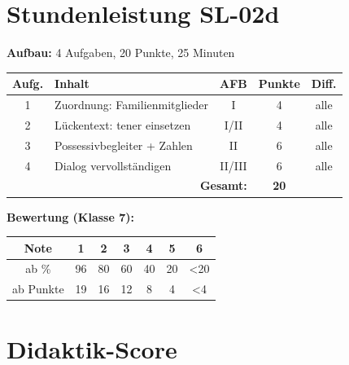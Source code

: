 \documentclass[11pt,a4paper]{article}
\begin{document}
\section{Stundenleistung SL-02d}

\textbf{Aufbau:} 4 Aufgaben, 20 Punkte, 25 Minuten

\begin{tabular}{|c|l|c|c|c|}
\hline
\textbf{Aufg.} & \textbf{Inhalt} & \textbf{AFB} & \textbf{Punkte} & \textbf{Diff.} \\
\hline
1 & Zuordnung: Familienmitglieder & I & 4 & alle \\
\hline
2 & Lückentext: tener einsetzen & I/II & 4 & alle \\
\hline
3 & Possessivbegleiter + Zahlen & II & 6 & alle \\
\hline
4 & Dialog vervollständigen & II/III & 6 & alle \\
\hline
\multicolumn{3}{|r|}{\textbf{Gesamt:}} & \textbf{20} & \\
\hline
\end{tabular}

\vspace{1em}

\textbf{Bewertung (Klasse 7):}
\begin{tabular}{|c|c|c|c|c|c|c|}
\hline
Note & 1 & 2 & 3 & 4 & 5 & 6 \\
\hline
ab \% & 96 & 80 & 60 & 40 & 20 & <20 \\
\hline
ab Punkte & 19 & 16 & 12 & 8 & 4 & <4 \\
\hline
\end{tabular}

\newpage
\section{Didaktik-Score}
\end{document}
